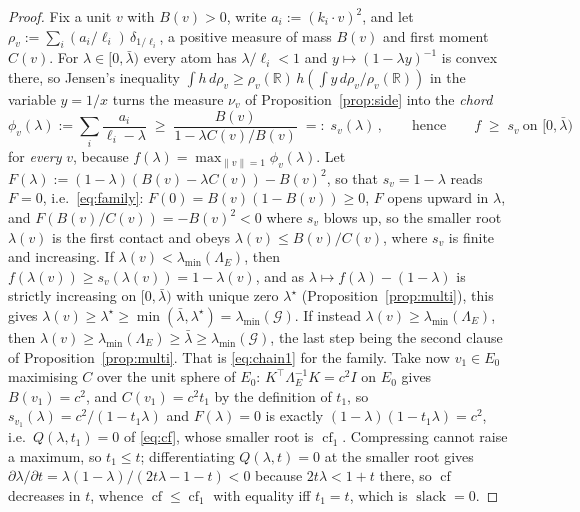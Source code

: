 \documentclass[11pt]{article}
\theoremstyle{remark}
\newcommand{\Gr}{\mathcal{G}}
\newcommand{\Le}{\Lambda_E}
\begin{document}
\begin{proof}
Fix a unit $v$ with $B(v)>0$, write $a_i:=(k_i\cdot v)^{2}$, and let
$\rho_v:=\sum_i(a_i/\ell_i)\,\delta_{1/\ell_i}$, a positive measure of mass $B(v)$ and first moment
$C(v)$. For $\lambda\in[0,\bar\lambda)$ every atom has $\lambda/\ell_i<1$ and
$y\mapsto(1-\lambda y)^{-1}$ is convex there, so Jensen's inequality
$\int h\,d\rho_v\ge\rho_v(\mathbb R)\,h(\int y\,d\rho_v/\rho_v(\mathbb R))$ in the variable $y=1/x$
turns the measure $\nu_v$ of Proposition~\ref{prop:side} into the \emph{chord}
\[
  \phi_v(\lambda):=\sum_i\frac{a_i}{\ell_i-\lambda}\;\ge\;\frac{B(v)}{1-\lambda C(v)/B(v)}
  \;=:\;s_v(\lambda)\,,\qquad\text{hence}\qquad f\;\ge\;s_v\ \text{on }[0,\bar\lambda)
\]
for \emph{every} $v$, because $f(\lambda)=\max_{\|v\|=1}\phi_v(\lambda)$. Let
$F(\lambda):=(1-\lambda)(B(v)-\lambda C(v))-B(v)^{2}$, so that $s_v=1-\lambda$ reads $F=0$, i.e.\
\eqref{eq:family}: $F(0)=B(v)(1-B(v))\ge0$, $F$ opens upward in $\lambda$, and
$F(B(v)/C(v))=-B(v)^{2}<0$ where $s_v$ blows up, so the smaller root $\lambda(v)$ is the first
contact and obeys $\lambda(v)\le B(v)/C(v)$, where $s_v$ is finite and increasing. If
$\lambda(v)<\lambda_{\min}(\Le)$, then
$f(\lambda(v))\ge s_v(\lambda(v))=1-\lambda(v)$, and as
$\lambda\mapsto f(\lambda)-(1-\lambda)$ is strictly increasing on $[0,\bar\lambda)$ with unique zero
$\lambda^{\star}$ (Proposition~\ref{prop:multi}), this gives $\lambda(v)\ge\lambda^{\star}\ge
\min(\bar\lambda,\lambda^{\star})=\lambda_{\min}(\Gr)$. If instead
$\lambda(v)\ge\lambda_{\min}(\Le)$, then
$\lambda(v)\ge\lambda_{\min}(\Le)\ge\bar\lambda\ge\lambda_{\min}(\Gr)$, the last step being the second
clause of Proposition~\ref{prop:multi}. That is \eqref{eq:chain1} for the family. Take now $v_1\in E_0$
maximising $C$ over the unit sphere of $E_0$: $K^{\top}\Le^{-1}K=c^{2}I$ on $E_0$ gives $B(v_1)=c^{2}$,
and $C(v_1)=c^{2}t_1$ by the definition of $t_1$, so $s_{v_1}(\lambda)=c^{2}/(1-t_1\lambda)$ and
$F(\lambda)=0$ is exactly $(1-\lambda)(1-t_1\lambda)=c^{2}$, i.e.\ $Q(\lambda,t_1)=0$ of \eqref{eq:cf},
whose smaller root is $\operatorname{cf}_1$. Compressing cannot raise a maximum, so $t_1\le t$;
differentiating $Q(\lambda,t)=0$ at the smaller root gives
$\partial\lambda/\partial t=\lambda(1-\lambda)/(2t\lambda-1-t)<0$ because $2t\lambda<1+t$ there, so
$\operatorname{cf}$ decreases in $t$, whence $\operatorname{cf}\le\operatorname{cf}_1$ with equality
iff $t_1=t$, which is $\operatorname{slack}=0$.
\end{proof}
\end{document}
